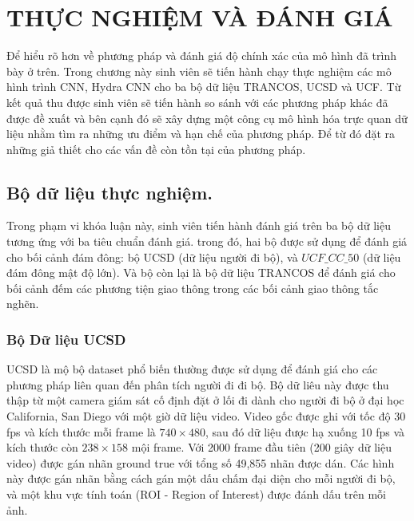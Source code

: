 \chapter{THỰC NGHIỆM VÀ ĐÁNH GIÁ}
\ifpdf
    \graphicspath{{Chapter4/Chapter3Figs/PNG/}{Chapter4/Chapter4Figs/PDF/}{Chapter4/Chapter4Figs/}}
\else
    \graphicspath{{Chapter4/Chapter4Figs/EPS/}{Chapter4/Chapter4Figs/}}
\fi

 
 	Để hiểu rõ hơn về phương pháp và đánh giá độ chính xác của mô hình đã trình bày ở trên. Trong chương này sinh viên sẽ tiến hành chạy thực nghiệm các mô hình trình CNN, Hydra CNN cho ba bộ dữ liệu TRANCOS, UCSD và UCF. Từ kết quả thu được sinh viên sẽ tiến hành so sánh với các phương pháp khác đã được đề xuất và bên cạnh đó sẽ xây dựng một công cụ mô hình hóa trực quan dữ liệu nhằm tìm ra những ưu điểm và hạn chế của phương pháp. Để từ đó đặt ra những giả thiết cho các vấn đề còn tồn tại của phương pháp. 
\section{Bộ dữ liệu thực nghiệm.}

	Trong phạm vi khóa luận này, sinh viên tiến hành đánh giá trên ba bộ dữ liệu tương ứng với ba tiêu chuẩn đánh giá. trong đó, hai bộ được sử dụng để đánh giá cho bối cảnh đám đông: bộ UCSD (dữ liệu người đi bộ), và $UCF\_CC\_50$ (dữ liệu đám đông mật độ lớn). Và bộ còn lại là bộ dữ liệu TRANCOS để đánh giá cho bối cảnh đếm các phương tiện giao thông trong các bối cảnh giao thông tắc nghẽn.

\subsection{Bộ Dữ liệu UCSD}
	UCSD \cite{chan2008privacy} là mộ bộ dataset phổ biến thường được sử dụng để đánh giá cho các phương pháp liên quan đến phân tích người đi đi bộ. Bộ dữ liêu này được thu thập từ một camera giám sát cố định đặt ở lối đi dành cho người đi bộ ở đại học California, San Diego với một giờ dữ liệu video. Video gốc được ghi với tốc độ 30 fps và kích thước mỗi frame là $740 \times 480$, sau đó dữ liệu được hạ xuống 10 fps và kích thước còn $238 \times 158$ mội frame. Với 2000 frame đầu tiên (200 giây dữ liệu video) được gán nhãn ground true với tổng số 49,855 nhãn được dán.  Các hình này được gán nhãn bằng cách gán một dấu chấm đại diện cho mỗi người đi bộ, và một khu vực tính toán (ROI - Region of Interest) được đánh dấu trên mỗi ảnh. 
	
